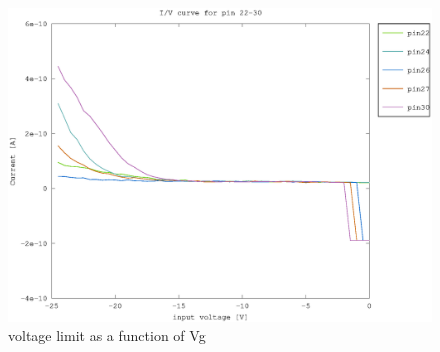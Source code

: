 \documentclass{article}
\begin{document}
\begin{figure}[h]
	    \centering
	    \includegraphics[width=\textwidth]{fig/pin22-30_slope_-25-0V.eps}
	    \caption[]%
	    {voltage limit as a function of Vg}    
	    \label{fig:vg_vs_vbo}	
\end{figure}
\end{document}

